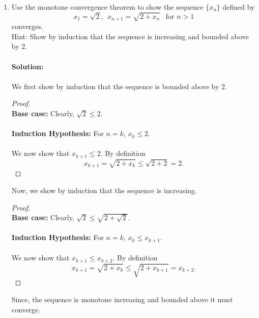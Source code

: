 \documentclass[12pt,letterpaper]{article}
\theoremstyle{plain}
\theoremstyle{definition}
\begin{document}
\begin{enumerate}[1.]
\begin{enumerate}[(a)]
\end{enumerate}
\item Use the monotone convergence theorem to show the sequence $\{x_n\}$ defined by
\[x_1=\sqrt{2},\ \ x_{n+1}=\sqrt{2+x_{n}}\ \ \text{ for }n>1\]
converges.
\vspace{.15in}\\
Hint: Show by induction that the sequence is increasing and bounded above by 2.\\
\ \\
{\bf Solution:}\\
\ \\
We first show by induction that the sequence is bounded above by 2.
\begin{proof}
\ \\
{\noindent\bf Base case: }Clearly, $\sqrt{2}\leq 2$.\\
\ \\
{\bf Induction Hypothesis: }For $n=k$, $x_k\leq 2$. \\
\ \\
We now show that $x_{k+1}\leq 2$. By definition 
\[x_{k+1}=\sqrt{2+x_k}\leq \sqrt{2+2}=2.\]
\end{proof}
Now, we show by induction that the sequence is increasing.
\begin{proof}
\ \\
{\bf Base case: }Clearly, $\sqrt{2}\leq \sqrt{2+\sqrt{2}}$.\\
\ \\
{\bf Induction Hypothesis: }For $n=k$, $x_k\leq x_{k+1}$. \\
\ \\
We now show that $x_{k+1}\leq x_{k+2}$. By definition 
\[x_{k+1}=\sqrt{2+x_k}\leq \sqrt{2+x_{k+1}}=x_{k+2}.\]
\end{proof}
Since, the sequence is monotone increasing and bounded above it must converge. 
\end{enumerate}
\end{document}
